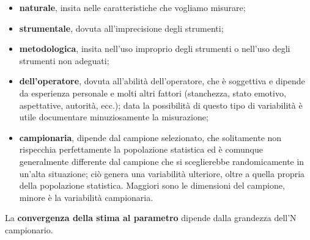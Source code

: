\documentclass[10pt, draft]{book}
\begin{document}
\begin{itemize}
    \item \textbf{naturale}, insita nelle caratteristiche che vogliamo misurare; 
    \item \textbf{strumentale}, dovuta all’imprecisione degli strumenti; 
    \item \textbf{metodologica}, insita nell’uso improprio degli strumenti o nell’uso degli strumenti non adeguati; 
    \item \textbf{dell’operatore}, dovuta all’abilità dell’operatore, che è soggettiva e dipende da esperienza personale e molti altri fattori (stanchezza, stato emotivo, aspettative, autorità, ecc.); data la possibilità di questo tipo di variabilità è utile documentare minuziosamente la misurazione;
    \item \textbf{campionaria}, dipende dal campione selezionato, che solitamente non rispecchia perfettamente la popolazione statistica ed è comunque generalmente differente dal campione che si sceglierebbe randomicamente in un’alta situazione; ciò genera una variabilità ulteriore, oltre a quella propria della popolazione statistica. Maggiori sono le dimensioni del campione, minore è la variabilità campionaria.
\end{itemize}
La \textbf{convergenza della stima al parametro} dipende dalla grandezza dell’N campionario.
\end{document}
